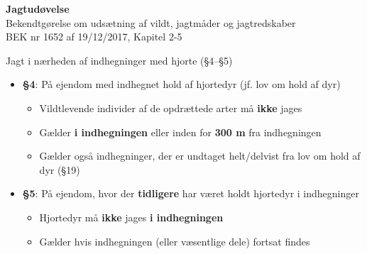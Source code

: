 \begin{frame}
  \vspace{3em}
  \begin{center}
    {\LARGE \textbf{Jagtudøvelse}
    }
    \\
    \vspace{1em}
    Bekendtgørelse om udsætning af vildt, jagtmåder og jagtredskaber
    \\
    \vspace{1em}
    BEK nr 1652 af 19/12/2017, Kapitel 2-5
  \end{center}
\end{frame}

\begin{frame}{Jagt i nærheden af indhegninger med hjorte (§4–§5)}
    \begin{itemize}
        \item \textbf{§4}: På ejendom med indhegnet hold af hjortedyr (jf. lov om hold af dyr)
          \begin{itemize}
            \item Vildtlevende individer af de opdrættede arter må \textbf{ikke} jages
            \item Gælder \textbf{i indhegningen} eller inden for \textbf{300 m} fra indhegningen
            \item Gælder også indhegninger, der er undtaget helt/delvist fra lov om hold af dyr (§19)
          \end{itemize}
        \item \textbf{§5}: På ejendom, hvor der \textbf{tidligere} har været holdt hjortedyr i indhegninger
          \begin{itemize}
            \item Hjortedyr må \textbf{ikke} jages \textbf{i indhegningen}
            \item Gælder hvis indhegningen (eller væsentlige dele) fortsat findes
          \end{itemize}
    \end{itemize}
\end{frame}



